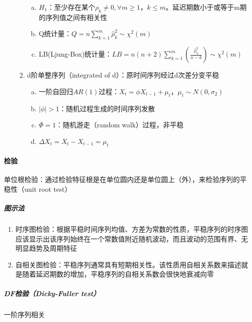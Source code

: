 \documentclass[12pt]{book}
\begin{document}
\begin{enumerate}[1.]
\begin{enumerate}[(1)]
\begin{enumerate}[a.]
        \item $H_1$：至少存在某个$\rho _k\neq 0,\forall m\geqslant 1，k\leqslant m$。延迟期数小于或等于m期的序列值之间有相关性  
        \item Q统计量：$Q=n\sum_{k=1}^{m}{\hat{\rho}}_k^2\sim \chi^2\left(m\right)$  
        \item LB(Ljung-Box)统计量：$LB=n(n+2)\sum_{k=1}^{m}{(\frac{{\hat{\rho}}_k^2}{n-k})}\sim\chi^2(m)$
    \end{enumerate}
    \item d阶单整序列（integrated of d）：原时间序列经过d次差分变平稳
    \begin{enumerate}[a.]
        \item 一阶自回归$AR(1)$过程：$X_t=\phi X_{t-1}+\mu_t，\mu_t\sim N(0,\sigma_2)$  
        \item $\left|\phi\right|>1$：随机过程生成的时间序列发散  
        \item $\Phi=1$：随机游走（random walk）过程，非平稳  
        \item $\Delta X_t=X_t-X_{t-1}=\mu_t$
    \end{enumerate}
\end{enumerate}
\end{enumerate}








\paragraph{检验}
单位根检验：通过检验特征根是在单位圆内还是单位圆上（外），来检验序列的平稳性（unit root test）

\subparagraph{图示法}

\begin{enumerate}[1.]
    \item 时序图检验：根据平稳时间序列均值、方差为常数的性质，平稳序列的时序图应该显示出该序列始终在一个常数值附近随机波动，而且波动的范围有界、无明显趋势及周期特征  
    \item 自相关图检验：平稳序列通常具有短期相关性。该性质用自相关系数来描述就是随着延迟期数的增加，平稳序列的自相关系数会很快地衰减向零
\end{enumerate}


\subparagraph{DF检验（Dicky-Fuller test）}

一阶序列相关
\end{document}
